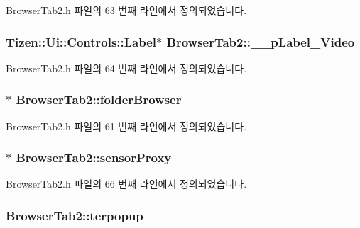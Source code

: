 Browser\+Tab2.\+h 파일의 63 번째 라인에서 정의되었습니다.

\hypertarget{class_browser_tab2_a7768e46f5a505aaa85e5ce199df7c8fc}{
\subsubsection[{\+\_\+\+\_\+p\+Label\+\_\+\+Video}]{\setlength{\rightskip}{0pt plus 5cm}Tizen\+::\+Ui\+::\+Controls\+::\+Label$\ast$ Browser\+Tab2\+::\+\_\+\+\_\+p\+Label\+\_\+\+Video\hspace{0.3cm}{\ttfamily [private]}}}\label{class_browser_tab2_a7768e46f5a505aaa85e5ce199df7c8fc}


Browser\+Tab2.\+h 파일의 64 번째 라인에서 정의되었습니다.

\hypertarget{class_browser_tab2_ae1cb54bfa632e894ff9bb34042e70bec}{
\subsubsection[{folder\+Browser}]{$\ast$ Browser\+Tab2\+::folder\+Browser\hspace{0.3cm}{\ttfamily [private]}}}\label{class_browser_tab2_ae1cb54bfa632e894ff9bb34042e70bec}


Browser\+Tab2.\+h 파일의 61 번째 라인에서 정의되었습니다.

\hypertarget{class_browser_tab2_acdb2087a425df9397078e186c10ccdda}{
\subsubsection[{sensor\+Proxy}]{$\ast$ Browser\+Tab2\+::sensor\+Proxy\hspace{0.3cm}{\ttfamily [private]}}}\label{class_browser_tab2_acdb2087a425df9397078e186c10ccdda}


Browser\+Tab2.\+h 파일의 66 번째 라인에서 정의되었습니다.

\hypertarget{class_browser_tab2_a50b6f9c7103581c30b6a3729f80af987}{
\subsubsection[{terpopup}]{ Browser\+Tab2\+::terpopup\hspace{0.3cm}{\ttfamily [private]}}}\label{class_browser_tab2_a50b6f9c7103581c30b6a3729f80af987}


